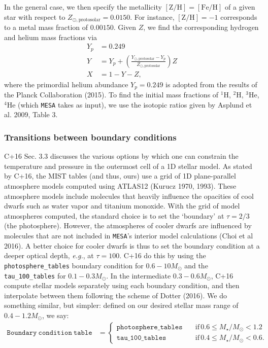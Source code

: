 \documentclass{article}
\begin{document}
In the general case, we then specify the metallicity $\mathrm{[Z/H]=[Fe/H]}$ of 
a given star with respect to $Z_{\odot,\mathrm{protosolar}} = 0.0150$. For 
instance, $\mathrm{[Z/H]=-1}$ corresponds to a metal mass fraction of $0.00150$.
Given $Z$, we find the corresponding hydrogen and helium mass fractions via
\begin{align}
Y_p &= 0.249 
\label{eq:Planck_primordial_He}\\
Y &= Y_p + 
\left(\frac{Y_{\odot,\mathrm{protosolar}}-Y_p}{Z_{\odot,\mathrm{protosolar}}} 
\right) Z \\
X &= 1 - Y - Z,
\end{align}
where the primordial helium abundance $Y_p=0.249$ is adopted from the results 
of the Planck Collaboration (2015).
To find the initial mass fractions of $\mathrm{^1H}$, $\mathrm{^2H}$, 
$\mathrm{^3 He}$, $\mathrm{^4 He}$ (which \texttt{MESA} takes as input), we 
use the isotopic ratios given by Asplund et al. 2009, Table 3.

\subsubsection{Transitions between boundary conditions}
\label{sec:transitions}
C+16 Sec. 3.3 discusses the various options by which one can constrain the 
temperature and pressure in the outermost cell of a 1D stellar model.
As stated by C+16, the MIST tables (and thus, ours) use a grid 
of 1D plane-parallel atmosphere models computed using ATLAS12 (Kurucz 1970, 
1993). These atmosphere models include molecules that heavily influence the 
opacities of cool dwarfs such as water vapor and titanium monoxide.
With the grid of model atmospheres computed, the standard choice is to set the 
`boundary' at $\tau=2/3$ (the photosphere).
However, the atmospheres of cooler dwarfs are influenced by molecules that are 
not included in \texttt{MESA}'s interior model calculations (Choi et al 2016).
A better choice for cooler dwarfs is thus to set the boundary condition 
at a deeper optical depth, \textit{e.g.}, at $\tau=100$.
C+16 do this by using the \texttt{photosphere\_tables} boundary condition 
for $0.6-10M_\odot$ and the \texttt{tau\_100\_tables} for $0.1-0.3M_\odot$. In 
the intermediate $0.3-0.6M_\odot$, C+16 compute stellar models separately 
using each boundary condition, and then interpolate between them following the 
scheme of Dotter (2016).
We do something similar, but simpler: defined on our desired stellar mass range 
of $0.4-1.2M_\odot$, we say: 
\begin{align}
\mathtt{Boundary\ condition\ table} &=
\begin{cases}
\mathtt{photosphere\_tables} \quad 
&\mathrm{if}\,0.6\leq M_\star/M_\odot<1.2\\
\mathtt{tau\_100\_tables} \quad 
&\mathrm{if}\,0.4\leq M_\star/M_\odot<0.6.
\end{cases}
\end{align}
\end{document}
